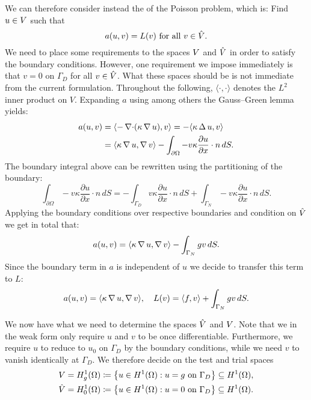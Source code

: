 We can therefore consider instead the  of the Poisson
problem, which is: Find \( u \in V \) such that 
\begin{equation}
    a(u, v) = L(v) \text{ for all } v \in \hat{V}.
\end{equation}
We need to place some requirements to the spaces \(V \) and \(\hat{V}\) in
order to satisfy the boundary conditions. However, one requirement we impose
immediately is that \(v = 0\) on \( \Gamma_D \) for all \( v \in \hat{V}\).  What
these spaces should be is not immediate from the current formulation. Throughout
the following, \( \langle \cdot, \cdot \rangle \) denotes the \( L^2 \) inner
product on \( V \). Expanding \( a \) using among others the Gauss--Green
lemma yields:
\begin{align}
    a(u, v) &= \langle -\operatorname{\mathop{}\!\nabla \cdot}(\kappa \operatorname{\mathop{}\!\nabla} u), v \rangle = -\langle \kappa \operatorname{\mathop{}\!\Delta} u, v \rangle\\
            &= \langle \kappa \operatorname{\mathop{}\!\nabla} u, \operatorname{\mathop{}\!\nabla} v \rangle - \int_{\partial\Omega} - v \kappa  \frac{\partial u}{\partial x}  \cdot n \, dS.
\end{align}
The boundary integral above can be rewritten using the partitioning of the boundary:
\begin{equation}
    \int_{\partial\Omega} -v \kappa  \frac{\partial u}{\partial x}  \cdot n \, dS =
    -\int_{\Gamma_D} v \kappa \frac{\partial u}{\partial x} \cdot n \, dS + \int_{\Gamma_N} -v \kappa \frac{\partial u}{\partial x} \cdot n \, dS.
\end{equation}
Applying the boundary conditions over respective boundaries and condition on \(
\hat{V} \) we get in total that:
\begin{equation}
    a(u, v) = \langle \kappa\operatorname{\mathop{}\!\nabla} u, \operatorname{\mathop{}\!\nabla} v \rangle - \int_{\Gamma_N} g v \, dS.
\end{equation}
Since the boundary term in \( a \) is independent of \( u \) we decide to
transfer this term to \( L \):
\begin{equation}
    a(u, v) = \langle \kappa\operatorname{\mathop{}\!\nabla} u, \operatorname{\mathop{}\!\nabla} v \rangle, \quad L(v) = \langle f, v
    \rangle + \int_{\Gamma_N} g v \, dS.
\end{equation}


We now have what we need to determine the spaces \( \hat{V} \) and \( V \).
Note that we in the weak form only require \( u \) and \( v \) to be once
differentiable. Furthermore, we require \( u \) to reduce to \( u_0 \) on \(
\Gamma_D \) by the boundary conditions, while we need \( v \) to vanish
identically at \(\Gamma_D\). We therefore decide on the test and trial spaces
\begin{align}
    V &= H^1_g(\Omega) \coloneqq \left\{ u \in H^1(\Omega) : u = g \text{ on } \Gamma_D \right\} \subseteq H^1(\Omega),\\
    \hat{V} &= H^1_0(\Omega) \coloneqq \left\{ u \in H^1(\Omega) : u = 0 \text{ on } \Gamma_D \right\} \subseteq H^1 (\Omega).
\end{align}

